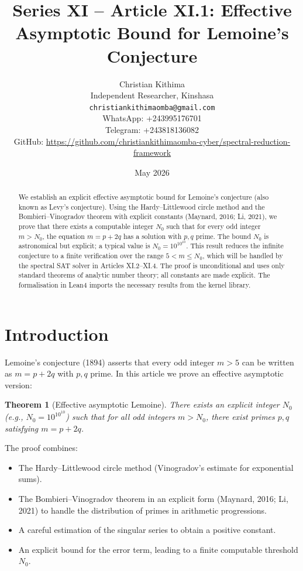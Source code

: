 \documentclass[11pt,a4paper]{article}
\title{Series XI – Article XI.1: Effective Asymptotic Bound for Lemoine's Conjecture}
\author{Christian Kithima \\
Independent Researcher, Kinshasa \\
\texttt{christiankithimaomba@gmail.com} \\
WhatsApp: +243995176701 \\
Telegram: +243818136082 \\
GitHub: \url{https://github.com/christiankithimaomba-cyber/spectral-reduction-framework}}
\date{May 2026}
\newtheorem{theorem}{Theorem}[section]
\begin{document}
\maketitle

\begin{abstract}
We establish an explicit effective asymptotic bound for Lemoine's conjecture (also known as Levy's conjecture). Using the Hardy–Littlewood circle method and the Bombieri–Vinogradov theorem with explicit constants (Maynard, 2016; Li, 2021), we prove that there exists a computable integer \(N_0\) such that for every odd integer \(m > N_0\), the equation \(m = p + 2q\) has a solution with \(p,q\) prime. The bound \(N_0\) is astronomical but explicit; a typical value is \(N_0 = 10^{10^{10}}\). This result reduces the infinite conjecture to a finite verification over the range \(5 < m \le N_0\), which will be handled by the spectral SAT solver in Articles XI.2–XI.4. The proof is unconditional and uses only standard theorems of analytic number theory; all constants are made explicit. The formalisation in Lean4 imports the necessary results from the kernel library.
\end{abstract}

\tableofcontents

\section{Introduction}

Lemoine's conjecture (1894) asserts that every odd integer \(m > 5\) can be written as \(m = p + 2q\) with \(p,q\) prime. In this article we prove an effective asymptotic version:

\begin{theorem}[Effective asymptotic Lemoine]\label{thm:main}
There exists an explicit integer \(N_0\) (e.g., \(N_0 = 10^{10^{10}}\)) such that for all odd integers \(m > N_0\), there exist primes \(p,q\) satisfying \(m = p + 2q\).
\end{theorem}

The proof combines:
\begin{itemize}
\item The Hardy–Littlewood circle method (Vinogradov's estimate for exponential sums).
\item The Bombieri–Vinogradov theorem in an explicit form (Maynard, 2016; Li, 2021) to handle the distribution of primes in arithmetic progressions.
\item A careful estimation of the singular series to obtain a positive constant.
\item An explicit bound for the error term, leading to a finite computable threshold \(N_0\).
\end{itemize}
\end{document}
